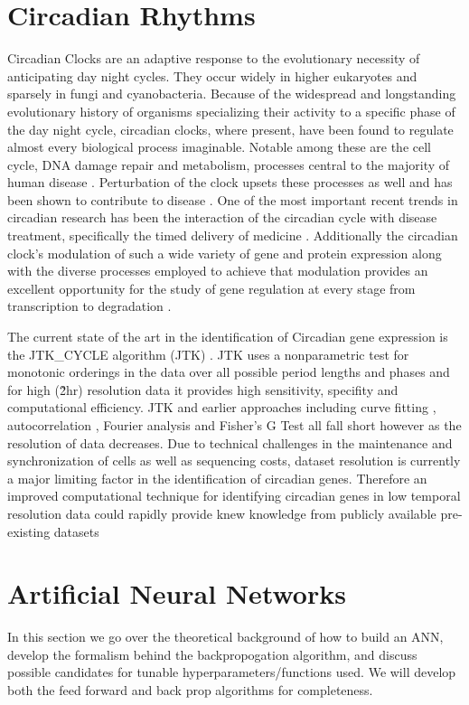 \documentclass[prl,amsmath,amssymb,floatfix,superscriptaddress,notitlepage,twocolumn]{revtex4}
\begin{document}
\section{Circadian Rhythms}
Circadian Clocks are an adaptive response to the evolutionary necessity of anticipating day night cycles.  They occur widely in higher eukaryotes and sparsely in fungi and cyanobacteria.  Because of the widespread and longstanding evolutionary history of organisms specializing their activity to a specific phase of the day night cycle, circadian clocks, where present, have been found to regulate almost every biological process imaginable.  Notable among these are the cell cycle, DNA damage repair and metabolism, processes central to the majority of human disease \cite{Dunlap99}.  Perturbation of the clock upsets these processes as well and has been shown to contribute to disease \cite{Bass10}.  One of the most important recent trends in circadian research has been the interaction of the circadian cycle with disease treatment, specifically the timed delivery of medicine \cite{Zhang14}.  Additionally the circadian clock's modulation of such a wide variety of gene and protein expression along with the diverse processes employed to achieve that modulation provides an excellent opportunity for the study of gene regulation at every stage from transcription to degradation \cite{Mehra09,Menet14}.

The current state of the art in the identification of Circadian gene expression is the JTK\_CYCLE algorithm (JTK) \cite{Hughes10}.  JTK uses a nonparametric test for monotonic orderings in the data over all possible period lengths and phases and for high (\~2hr) resolution data it provides high sensitivity, specifity and computational efficiency.  JTK and earlier approaches including curve fitting \cite{Straume04}, autocorrelation \cite{Levine02}, Fourier analysis \cite{Wichert04,Whitfield04} and Fisher's G Test \cite{Wichert04} all fall short however as the resolution of data decreases.  Due to technical challenges in the maintenance and synchronization of cells as well as sequencing costs, dataset resolution is currently a major limiting factor in the identification of circadian genes.  Therefore an improved computational technique for identifying circadian genes in low temporal resolution data could rapidly provide knew knowledge from publicly available pre-existing datasets

\section{Artificial Neural Networks}
In this section we go over the theoretical background of how to build an ANN, develop the formalism behind the backpropogation algorithm, and discuss possible candidates for tunable hyperparameters/functions used. We will develop both the feed forward and back prop algorithms for completeness. 
\end{document}
